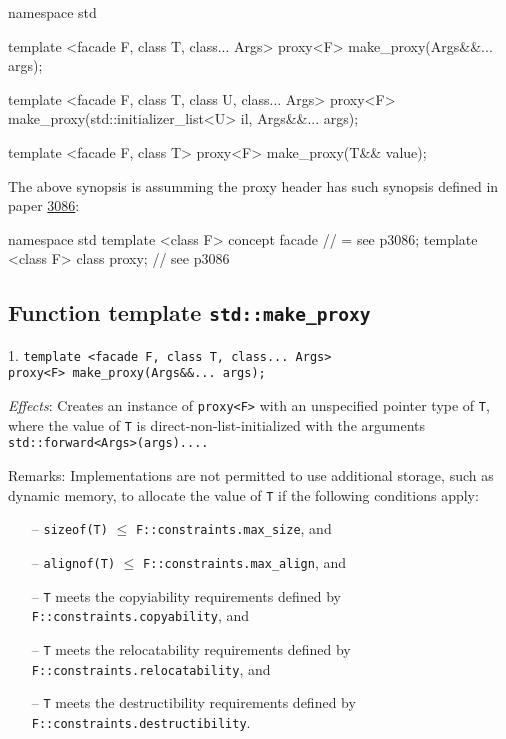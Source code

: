 \documentclass[10pt, a4paper, oneside]{article}
\begin{document}
\begin{codeblock}
namespace std {
  template <facade F, class T, class... Args>
  proxy<F> make_proxy(Args&&... args);
  
  template <facade F, class T, class U, class... Args>
  proxy<F> make_proxy(std::initializer_list<U> il, Args&&... args);
  
  template <facade F, class T>
  proxy<F> make_proxy(T&& value);
}
\end{codeblock}

\noindent The above synopsis is assumming the proxy header has such synopsis defined in paper \href{https://wg21.link/p3086}{3086}:
\begin{codeblock}
namespace std {
  template <class F>
    concept facade // = see p3086;
  template <class F>
    class proxy; // see p3086
}

\end{codeblock}

\subsection{Function template \texttt{std::make\_proxy}}
1. \verb|template <facade F, class T, class... Args>|\\
\indent \verb|proxy<F> make_proxy(Args&&... args);|

\textit{Effects}: Creates an instance of \verb|proxy<F>| with an unspecified pointer type of \verb|T|,
where the value of \verb|T| is direct-non-list-initialized with the arguments \verb|std::forward<Args>(args)....|

Remarks: Implementations are not permitted to use additional storage, such as dynamic memory, to
allocate the value of \verb|T| if the following conditions apply:
\begin{itemize}
  \item[--] \verb|sizeof(T)| $\le$ \verb|F::constraints.max_size|, and
  \item[--] \verb|alignof(T)| $\le$ \verb|F::constraints.max_align|, and
  \item[--] \verb|T| meets the copyiability requirements defined by \verb|F::constraints.copyability|, and
  \item[--] \verb|T| meets the relocatability requirements defined by \verb|F::constraints.relocatability|, and
  \item[--] \verb|T| meets the destructibility requirements defined by \verb|F::constraints.destructibility|.
\end{itemize}
\end{document}
